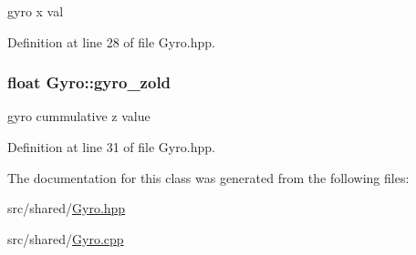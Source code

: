 gyro x val 



Definition at line 28 of file Gyro.\-hpp.

\hypertarget{classGyro_a50fdddd60b9220d2f61645653dd6053d}{
\subsubsection[{gyro\-\_\-zold}]{\setlength{\rightskip}{0pt plus 5cm}float Gyro\-::gyro\-\_\-zold\hspace{0.3cm}{\ttfamily [private]}}}\label{classGyro_a50fdddd60b9220d2f61645653dd6053d}


gyro cummulative z value 



Definition at line 31 of file Gyro.\-hpp.



The documentation for this class was generated from the following files\-:\begin{DoxyCompactItemize}
\item 
src/shared/\hyperlink{Gyro_8hpp}{Gyro.\-hpp}\item 
src/shared/\hyperlink{Gyro_8cpp}{Gyro.\-cpp}\end{DoxyCompactItemize}

